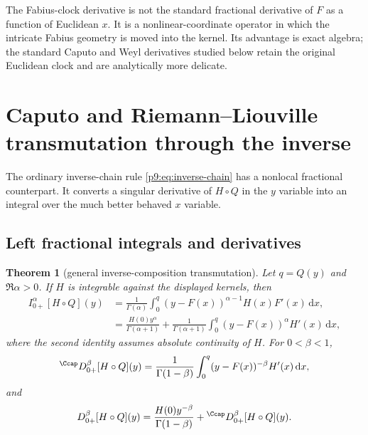 \documentclass[11pt,oneside]{article}
\newtheorem{theorem}{Theorem}[section]
\theoremstyle{definition}
\theoremstyle{remark}
\newcommand{\dd}{\,\mathrm d}
\newcommand{\1}{\mathbf 1}
\begin{document}
\begin{remark}
The Fabius-clock derivative is not the standard fractional derivative of
$F$ as a function of Euclidean $x$.  It is a nonlinear-coordinate operator in
which the intricate Fabius geometry is moved into the kernel.  Its advantage
is exact algebra; the standard Caputo and Weyl derivatives studied below
retain the original Euclidean clock and are analytically more delicate.
\end{remark}

\section{Caputo and Riemann--Liouville transmutation through the inverse}
\label{p9:sec:inverse-transmutation}

The ordinary inverse-chain rule \cref{p9:eq:inverse-chain} has a nonlocal
fractional counterpart.  It converts a singular derivative of $H\circ Q$ in
the $y$ variable into an integral over the much better behaved $x$ variable.

\subsection{Left fractional integrals and derivatives}

\begin{theorem}[general inverse-composition transmutation]
\label{p9:thm:left-transmutation}
Let $q=Q(y)$ and $\Re\alpha>0$.  If $H$ is integrable against the displayed
kernels, then
\begin{align}
 I_{0+}^\alpha[H\circ Q](y)
 &=\frac1{\Gamma(\alpha)}
   \int_0^q(y-F(x))^{\alpha-1}H(x)F'(x)\dd x,
 \label{p9:eq:inverse-RL-substitution}\\
 &=\frac{H(0)y^\alpha}{\Gamma(\alpha+1)}
   +\frac1{\Gamma(\alpha+1)}
    \int_0^q(y-F(x))^\alpha H'(x)\dd x,
 \label{p9:eq:inverse-RL-parts}
\end{align}
where the second identity assumes absolute continuity of $H$.
For $0<\beta<1$,
\begin{equation}
 {}^{\Ccap}D_{0+}^\beta[H\circ Q](y)
 =\frac1{\Gamma(1-\beta)}
  \int_0^q(y-F(x))^{-\beta}H'(x)\dd x,
 \label{p9:eq:inverse-Caputo-transmutation}
\end{equation}
and
\begin{equation}
 D_{0+}^\beta[H\circ Q](y)
 =\frac{H(0)y^{-\beta}}{\Gamma(1-\beta)}
  +{}^{\Ccap}D_{0+}^\beta[H\circ Q](y).
 \label{p9:eq:inverse-RL-vs-Caputo}
\end{equation}
\end{theorem}
\end{document}
